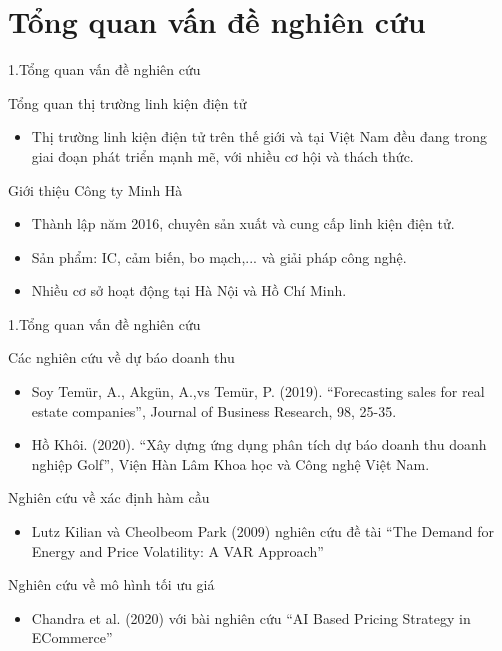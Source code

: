 \documentclass{beamer}
\begin{document}
	
  \section{Tổng quan vấn đề nghiên cứu}
	\begin{frame}{1.Tổng quan vấn đề nghiên cứu}
		\begin{block}{Tổng quan thị trường linh kiện điện tử}
			\begin{itemize} 
				\item Thị trường linh kiện điện tử trên thế giới và tại Việt Nam đều đang trong giai đoạn phát triển mạnh mẽ, với nhiều cơ hội và thách thức. 
			\end{itemize}
		\end{block}
		
		\begin{block}{Giới thiệu Công ty Minh Hà}
			\begin{itemize}
				\item Thành lập năm 2016, chuyên sản xuất và cung cấp linh kiện điện tử.
				\item Sản phẩm: IC, cảm biến, bo mạch,... và giải pháp công nghệ.
				\item Nhiều cơ sở hoạt động tại Hà Nội và Hồ Chí Minh.
				
			\end{itemize}
		\end{block}
	\end{frame}	
	\begin{frame}{1.Tổng quan vấn đề nghiên cứu}
		\begin{block}{Các nghiên cứu về dự báo doanh thu}
		   \begin{itemize}
			 \item Soy Temür, A., Akgün, A.,vs Temür, P. (2019). “Forecasting sales for real
			 estate companies”, Journal of Business Research, 98, 25-35.
			 \item Hồ Khôi. (2020). “Xây dựng ứng dụng phân tích dự báo doanh thu doanh
			 nghiệp Golf”, Viện Hàn Lâm Khoa học và Công nghệ Việt Nam.
		   \end{itemize}
		 \end{block}
		 \begin{block}{Nghiên cứu về xác định hàm cầu}
		  	\begin{itemize}
		  		\item Lutz Kilian và Cheolbeom Park (2009)
		  		nghiên cứu đề tài “The Demand for Energy and Price Volatility: A VAR Approach”
		  	\end{itemize}
		  \end{block}
		  \begin{block}{Nghiên cứu về mô hình tối ưu giá}
		  	\begin{itemize}
		  		\item Chandra et al. (2020) với bài nghiên cứu “AI Based Pricing Strategy in ECommerce”
		  	\end{itemize}
		  \end{block}
	\end{frame}
	
\end{document}
